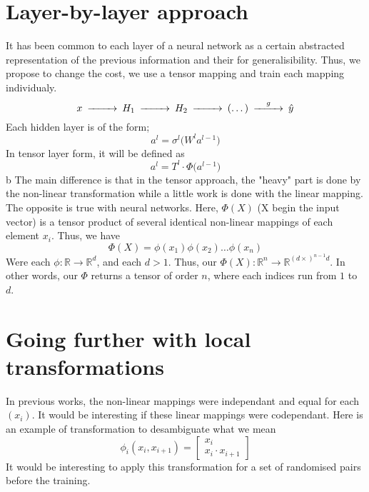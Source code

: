 \documentclass[11pt]{article}
\begin{document}
\section{Layer-by-layer approach}
It has been common to each layer of a neural network as a certain abstracted representation of the previous information and their for generalisibility. Thus, we propose to change the cost, we use a tensor mapping and train each mapping individualy.
\begin{equation*}
\begin{CD}
    x @>>>H_1 @>>>H_2 @>>>(\dots)@>g>> \hat{y}
\end{CD}
\end{equation*}
Each hidden layer is of the form;
\begin{equation*}
    a^l = \sigma^l \bigl( W^l a^{l-1} \bigr)
\end{equation*}
In tensor layer form, it will be defined as 
\begin{equation*}
    a^l = T^l \cdot \Phi \bigl( a^{l-1} \bigr)
\end{equation*}b
The main difference is that in the tensor approach, the "heavy" part is done by the non-linear transformation while a little work is done with the linear mapping. The opposite is true with neural networks. Here, $\Phi(X)$ (X begin the input vector) is a tensor product of several identical non-linear mappings of each element $x_i$. Thus, we have 
\begin{equation*}
    \Phi(X) = \phi(x_1)\phi(x_2)\dots\phi(x_n)
\end{equation*}
Were each $\phi : \mathbb{R} \rightarrow \mathbb{R}^d$, and each $d > 1$. Thus, our $\Phi(X) : \mathbb{R}^n \rightarrow \mathbb{R}^{ (d \times)^{n-1}d} $. In other words, our $\Phi$ returns a tensor of order $n$, where each indices run from $1$ to $d$.


\section{Going further with local transformations}
In previous works, the non-linear mappings were independant and equal for each $(x_i)$. It would be interesting if these linear mappings were codependant. Here is an example of transformation to desambiguate what we mean
\begin{equation*}
    \phi_i(x_{i}, x_{i+1}) = \begin{bmatrix}
                                x_{i} \\
                                x_{i} \cdot x_{i+1}
                            \end{bmatrix}
\end{equation*}
It would be interesting to apply this transformation for a set of randomised pairs before the training.
\end{document}
